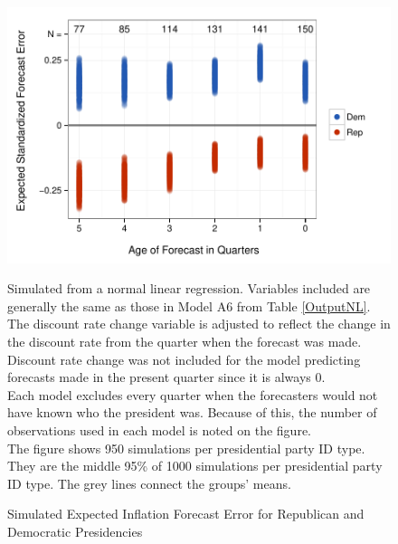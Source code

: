\documentclass[a4paper]{article}
\newenvironment{knitrout}{}{} %
\begin{document}
\begin{figure}[t]
    \caption{Simulated Expected Inflation Forecast Error for Republican and Democratic Presidencies}
    \label{ExpectValueParty}
    \begin{center}

\begin{knitrout}
\color{fgcolor}

{\centering \includegraphics[width=0.81\linewidth]{figure/ExpectValueParty} 

}



\end{knitrout}





    \end{center}
    \begin{singlespace}
        {\scriptsize{Simulated from a normal linear regression. Variables included are generally the same as those in Model A6 from Table \ref{OutputNL}. The discount rate change variable is adjusted to reflect the change in the discount rate from the quarter when the forecast was made. Discount rate change was not included for the model predicting forecasts made in the present quarter since it is always 0. \\ Each model excludes every quarter when the forecasters would not have known who the president was. Because of this, the number of observations used in each model is noted on the figure. \\ The figure shows 950 simulations per presidential party ID type. They are the middle 95\% of 1000 simulations per presidential party ID type. The grey lines connect the groups' means.}}
    \end{singlespace}
\end{figure}
\end{document}
